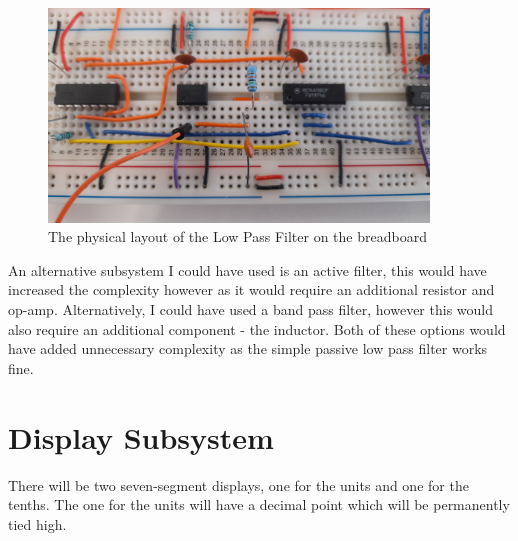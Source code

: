 \begin{figure} [H]
    \centering
    \begin{minipage}[t]{0.45\textwidth}
        \centering
        \includegraphics[width=0.9\textwidth]{images/comparatorNeatened.jpg}
        \caption{The physical layout of the Low Pass Filter on the breadboard}
        \label{fig:lpfPhysical}
    \end{minipage}\hfill
    \begin{minipage}[t]{0.45\textwidth}
        \centering
    \end{minipage}
\end{figure}

\noindent An alternative subsystem I could have used is an active filter, this would have increased the complexity however as it would require an additional resistor and op-amp. Alternatively, I could have used a band pass filter, however this would also require an additional component - the inductor. Both of these options would have added unnecessary complexity as the simple passive low pass filter works fine.

\section{Display Subsystem}
There will be two seven-segment displays, one for the units and one for the tenths. The one for the units will have a decimal point which will be permanently tied high.
